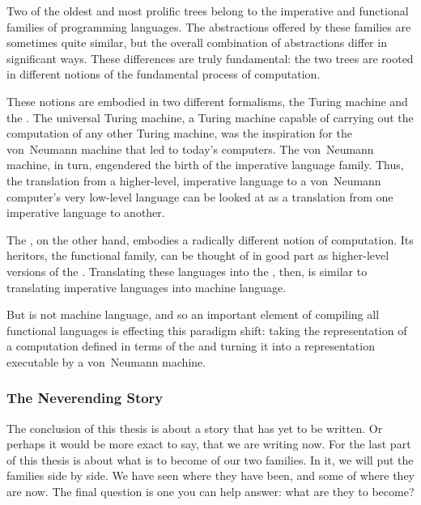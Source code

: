 Two of the oldest and most prolific trees belong to the imperative and functional families of programming languages. The abstractions offered by these families are sometimes quite similar, but the overall combination of abstractions differ in significant ways. These differences are truly fundamental: the two trees are rooted in different notions of the fundamental process of computation.

These notions are embodied in two different formalisms, the Turing machine and the \lambdacalc{}. The universal Turing machine, a Turing machine capable of carrying out the computation of any other Turing machine, was the inspiration for the von~Neumann machine that led to today's computers. The von~Neumann machine, in turn, engendered the birth of the imperative language family. Thus, the translation from a higher-level, imperative language to a von~Neumann computer's very low-level language can be looked at as a translation from one imperative language to another.

The \lambdacalc{}, on the other hand, embodies a radically different notion of computation. Its heritors, the functional family, can be thought of in good part as higher-level versions of the \lambdacalc{}. Translating these languages into the \lambdacalc{}, then, is similar to translating imperative languages into machine language.

But \lambdacalc is not machine language, and so an important element of compiling all functional languages is effecting this paradigm shift: taking the representation of a computation defined in terms of the \lambdacalc and turning it into a representation executable by a von~Neumann machine.

\subsubsection*{The Neverending Story}%
The conclusion of this thesis is about a story that has yet to be written. Or perhaps it would be more exact to say, that we are writing now. For the last part of this thesis is about what is to become of our two families. In it, we will put the families side by side. We have seen where they have been, and some of where they are now. The final question is one you can help answer: what are they to become?

\fixmarks